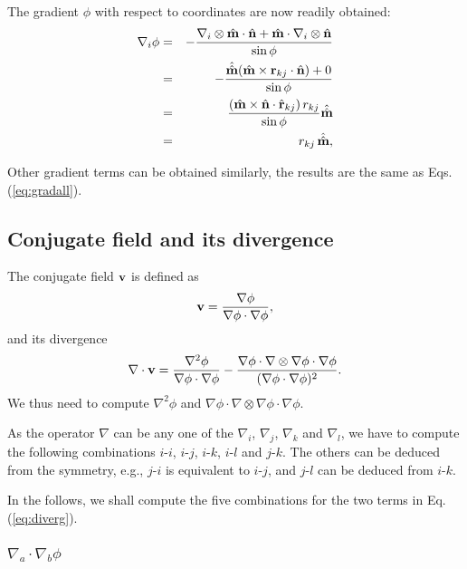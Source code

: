 \documentclass{article}
\begin{document}
The gradient $\phi$ with respect to coordinates are now readily obtained:
\begin{eqnarray*}
\nabla_i \phi &=& -\frac{ \nabla_i \otimes \hat{\mathbf{m}} \cdot \hat{\mathbf{n}}  + \hat{\mathbf{m}} \cdot \nabla_i \otimes \hat{\mathbf{n}} }
                  {\sin \phi} \\
              &=& -\frac{ \hat{\hat{\mathbf{m}}} (\hat{\mathbf{m}} \times \mathbf{r}_{kj} \cdot \hat{\mathbf{n}}) + 0 }
                  {\sin \phi} \\
              &=& \frac{ (\hat{\mathbf{m}} \times \hat{\mathbf{n}} \cdot \hat{\mathbf{r}}_{kj}) \, r_{kj} }
                  {\sin \phi} \hat{\hat{\mathbf{m}}} \\
              &=& r_{kj} \, \hat{\hat{\mathbf{m}}},
\end{eqnarray*}

Other gradient terms can be obtained similarly, the results are the same as Eqs. (\ref{eq:gradall}).




\subsection{Conjugate field and its divergence}


The conjugate field $\mathbf{v}$ is defined as
\begin{equation}
\mathbf{v} = \frac {\nabla \phi} {\nabla \phi \cdot \nabla \phi},
\end{equation}
and its divergence
\begin{equation}
\nabla \cdot \mathbf{v}  =
   \frac {\nabla^2 \phi}
         {\nabla \phi \cdot \nabla \phi}
 - \frac {\nabla \phi \cdot \nabla \otimes \nabla \phi \cdot \nabla \phi}
         {(\nabla \phi \cdot \nabla \phi)^2}.
\label{eq:diverg}
\end{equation}
%
We thus need to compute
$\nabla^2 \phi$
and
$\nabla \phi \cdot \nabla \otimes \nabla \phi \cdot \nabla \phi$.


As the operator $\nabla$ can be any one of the
$\nabla_i$, $\nabla_j$, $\nabla_k$ and $\nabla_l$,
we have to compute the following combinations
$i$-$i$, $i$-$j$, $i$-$k$, $i$-$l$ and $j$-$k$.
%
The others can be deduced from the symmetry,
e.g.,
$j$-$i$ is equivalent to $i$-$j$, and
$j$-$l$ can be deduced from $i$-$k$.

In the follows, we shall compute the five combinations for the two terms in
Eq. (\ref{eq:diverg}).

\subsubsection{$\nabla_a \cdot \nabla_b \phi$}
\end{document}
